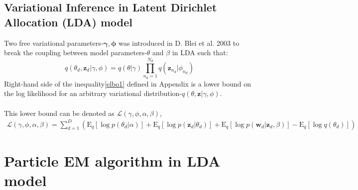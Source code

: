 \documentclass{article}
\newcommand{\be}{\begin{equation}}
\newcommand{\ee}{\end{equation}}
\newcommand{\bs}{\boldsymbol}
\newcommand{\ba}{\begin{array}}
\newcommand{\ea}{\end{array}}
\newcommand{\E}{\mathrm{E}}
\newcommand{\Sum}{\displaystyle\sum}
\newcommand{\Prod}{\displaystyle\prod}
\begin{document}
\subsection{Variational Inference in Latent Dirichlet Allocation  (LDA) model}
Two free variational parameters-$\bs{\gamma},\bs{\phi}$ was introduced in D. Blei et al. 2003 to break the coupling between  model parameters-$\theta$ and $\beta$ in LDA such that:\\
\[
q(\theta_d,\bs{z}_d|\gamma,\phi)=q(\theta|\gamma)\Prod_{n_d=1}^{N_d}q(\bs{z}_{n_d}|\phi_{n_d})
\]
Right-hand side of the inequality\ref{elbo1} defined in Appendix is a lower bound on the log likelihood for an arbitrary variational distribution-$q(\theta,\bs{z}|\gamma,\phi)$.\\
\\
This lower bound can be denoted as $\mathcal{L}(\gamma,\phi,\alpha,\beta)$,\\
\be\label{elbo2}
\ba{rcl}
\mathcal{L}(\gamma,\phi,\alpha,\beta)=\Sum_{d=1}^{D}\left(\E_{q}[\log p(\theta_d|\alpha)]+\E_{q}[\log p(\bs{z}_d|\theta_d)]+\E_{q}[\log p(\bs{w}_d|\bs{z}_d,\beta)]-\E_q[\log q(\theta_d)]\right)
\ea
\ee
\section{Particle EM algorithm in LDA model}
\end{document}
